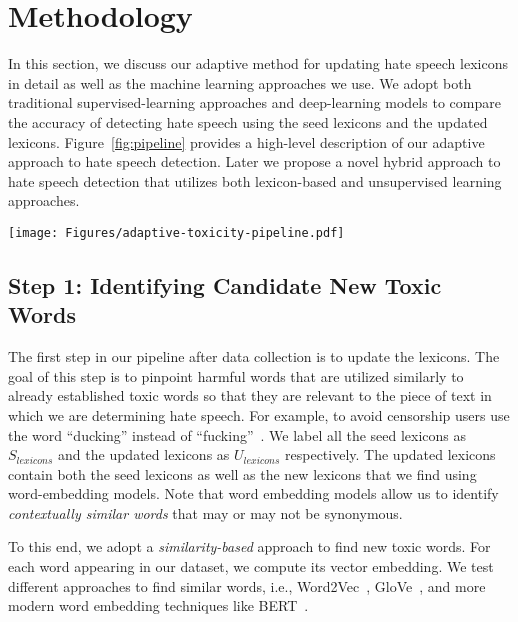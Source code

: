 \section{Methodology}
In this section, we discuss our adaptive method for updating hate speech lexicons in detail as well as the machine learning approaches we use.
We adopt both traditional supervised-learning approaches and deep-learning models to compare the accuracy of detecting hate speech using the seed lexicons and the updated lexicons. Figure~\ref{fig:pipeline} provides a high-level description of our adaptive approach to hate speech detection.
Later we propose a novel hybrid approach to hate speech detection that utilizes both lexicon-based and unsupervised learning approaches.

 \begin{figure*}[t!]
 	\centering
    \texttt{[image: Figures/adaptive-toxicity-pipeline.pdf]}
 	\caption{Architecture of our adaptive hate speech detection system.}
 	\label{fig:pipeline}
 \end{figure*}

\subsection{Step 1: Identifying Candidate New Toxic Words}
The first step in our pipeline after data collection is to update the lexicons.
The goal of this step is to pinpoint harmful words that are utilized similarly to already established toxic words so that they are relevant to the piece of text in which we are determining hate speech.
For example, to avoid censorship users use the word ``ducking'' instead of ``fucking''~\cite{theverge2023}.
We label all the seed lexicons as $S_{lexicons}$ and the updated lexicons as $U_{lexicons}$ respectively.
The updated lexicons contain both the seed lexicons as well as the new lexicons that we find using word-embedding models. Note that word embedding models allow us to identify \textit{contextually similar words} that may or may not be synonymous.


To this end, we adopt a \textit{similarity-based} approach to find new toxic words.
For each word appearing in our dataset, we compute its vector embedding.
We test different approaches to find similar words, i.e., Word2Vec~\cite{tensorflowWord2vec}, GloVe~\cite{glove}, and more modern word embedding techniques like BERT~\cite{bert}. %

